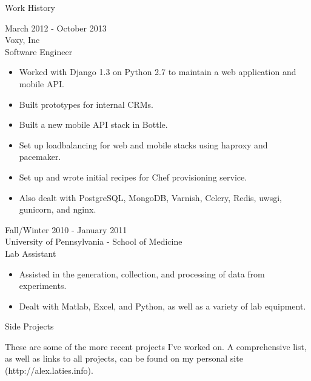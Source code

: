\documentclass[a4paper]{article}
\begin{document}
    \begin{Large}
        \noindent
        Work History
    \end{Large}
    \begingroup
        \fontsize{8pt}{12pt}\selectfont

        \begin{multicols}{2}
            \noindent
            March 2012 - October 2013 \\
            Voxy, Inc \\
            Software Engineer 
            \begin{itemize}
                \item Worked with Django 1.3 on Python 2.7 to maintain a web application and mobile API.
                \item Built prototypes for internal CRMs.
                \item Built a new mobile API stack in Bottle.
                \item Set up loadbalancing for web and mobile stacks using haproxy and pacemaker.
                \item Set up and wrote initial recipes for Chef provisioning service.
                \item Also dealt with PostgreSQL, MongoDB, Varnish, Celery, Redis, uwsgi, gunicorn, and nginx. 
            \end{itemize}
            \columnbreak
            Fall/Winter 2010 - January 2011 \\ 
            University of Pennsylvania - School of Medicine \\
            Lab Assistant
            \begin{itemize}
                \item Assisted in the generation, collection, and processing of data from experiments. 
                \item Dealt with Matlab, Excel, and Python, as well as a variety of lab equipment.
            \end{itemize}
        \end{multicols}
    \endgroup
    
    \begin{Large}
        \noindent
        Side Projects\\
    \end{Large}
    \begingroup
        \fontsize{8pt}{12pt}\selectfont
        These are some of the more recent projects I've worked on. A comprehensive list, as well as links to all projects, can be found on my personal site (http://alex.laties.info).
\end{document}
